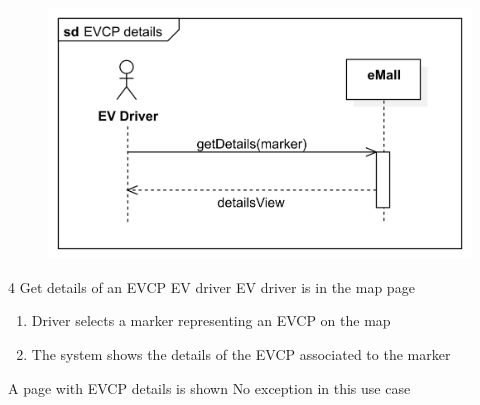 \usecase
{
    \begin{figure}[H]
        \centering
        \includegraphics[scale=0.9]{src/sequence_diagram/EVCPdetails.png}
    \end{figure}
}
{4}
{Get details of an EVCP}
{EV driver}
{EV driver is in the map page}
{
    \begin{enumerate}
        \item Driver selects a marker representing an EVCP on the map
        \item The system shows the details of the EVCP associated to the marker
    \end{enumerate}
}
{A page with EVCP details is shown}
{
    No exception in this use case
}
{
}

